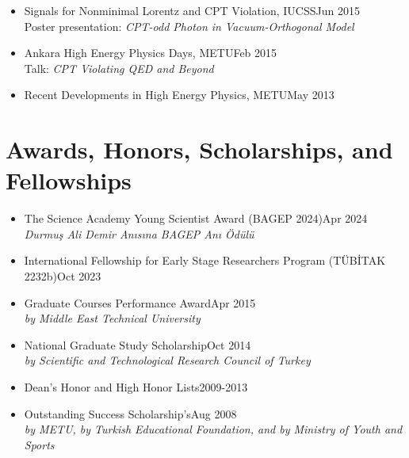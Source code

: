\documentclass[a4paper,11pt]{article}
\begin{document}
\begin{itemize}[itemsep=.001em]
	\item[] Signals for Nonminimal Lorentz and CPT Violation, IUCSS\hfill Jun 2015\\
					\hspace*{1.8em}Poster presentation: \emph{CPT-odd Photon in Vacuum-Orthogonal Model}
	\item[] Ankara High Energy Physics Days, METU\hfill Feb 2015\\
					\hspace*{1.8em}Talk: \emph{CPT Violating QED and Beyond}
	\item[] Recent Developments in High Energy Physics, METU\hfill May 2013
\end{itemize}

\section{\textcolor{burntorange}{Awards, Honors, Scholarships, and Fellowships}}
\begin{itemize}[itemsep=.001em] 
	\item[] The Science Academy Young Scientist Award (BAGEP 2024)\hfill Apr 2024\\
	\hspace*{1.8em}\emph{Durmuş Ali Demir Anısına BAGEP Anı Ödülü}
	\item[] International Fellowship for Early Stage Researchers Program (TÜBİTAK 2232b)\hfill Oct 2023
	\item[]  Graduate Courses Performance Award\hfill Apr 2015\\
\hspace*{1.8em}\emph{by Middle East Technical University}	
	\item[]  National Graduate Study Scholarship\hfill Oct 2014\\
	\hspace*{1.8em}\emph{by Scientific and Technological Research Council of Turkey}
	\item[] Dean’s Honor and High Honor Lists\hfill 2009-2013

	\item[] Outstanding Success Scholarship's\hfill Aug 2008\\
		\hspace*{1.8em}\emph{by METU, by Turkish Educational Foundation, and by Ministry of Youth and Sports}
\end{itemize}
\end{document}
